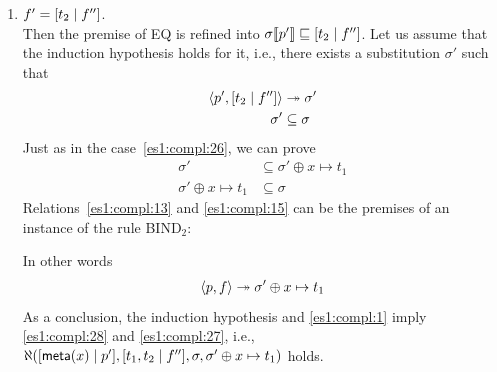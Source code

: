 \begin{enumerate}
\begin{enumerate}
\begin{enumerate}
\begin{itemize}
            \end{itemize}
            In both cases, we established that
            \begin{gather}
              \sigma' \oplus x \mapsto t_1 \subseteq
              \sigma \label{es1:compl:25}
            \end{gather}
            due to definition of inclusion \eqref{model:incl}. As a
            conclusion, the induction hypothesis and
            \eqref{es1:compl:1} imply \eqref{es1:compl:24} and
            \eqref{es1:compl:25}, that is, we have:
            \[\ind{W}(\cons{\meta{x},l}{{p}''},
            \cons{t_1,l}{f''}, \sigma, \sigma' \oplus x \mapsto t_1).\]

          \item \(f' = \cons{t_2}{f''}\).\\ Then the premise of
            \textsf{EQ} is refined into
            \(\subst{{p}'}{\sigma} \sqsubseteq
            \cons{t_2}{f''}\). Let us assume that the induction
            hypothesis holds for it, i.e., there exists a substitution
            \(\sigma'\) such that
            \begin{align}
              \smat{\cons{t_2}{f''}}{{p}'} &\twoheadrightarrow
              \sigma' \label{es1:compl:13}\\
              \sigma' &\subseteq \sigma\notag
            \end{align}
            Just as in the case~\ref{es1:compl:26}, we can prove
            \begin{align}
              \sigma' &\subseteq \sigma' \oplus x \mapsto t_1
              \label{es1:compl:15}\\
              \sigma' \oplus x \mapsto t_1 &\subseteq \sigma
              \label{es1:compl:27}
            \end{align}
            Relations~\eqref{es1:compl:13} and \eqref{es1:compl:15}
            can be the premises of an instance of the rule
            \textsf{BIND}\(_2\):
            In other words
            \begin{gather}
              \smj{f}{{p}}{\sigma' \oplus x \mapsto
                t_1} \label{es1:compl:28}
            \end{gather}
            As a conclusion, the induction hypothesis and
            \eqref{es1:compl:1} imply \eqref{es1:compl:28} and
            \eqref{es1:compl:27}, i.e.,
            \(\ind{W}(\cons{\meta{x}}{{p}'},
            \cons{t_1,t_2}{f''}, \sigma, \sigma' \oplus x \mapsto
            t_1)\) holds.
        \end{enumerate}


\end{enumerate}
\end{enumerate}
